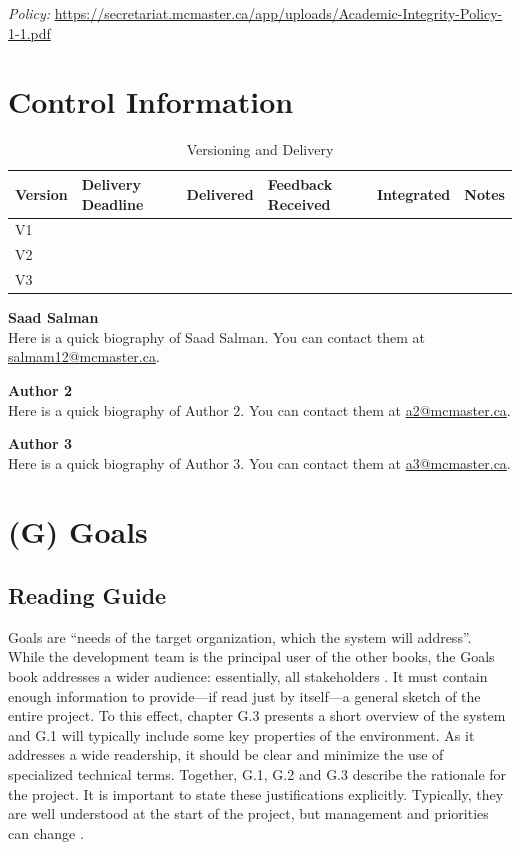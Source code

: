 \documentclass[12pt,letterpaper]{article}
\begin{document}
\medskip
\noindent\textit{Policy:} \url{https://secretariat.mcmaster.ca/app/uploads/Academic-Integrity-Policy-1-1.pdf}

\clearpage

\section{Control Information}
\begin{table}[h!]\centering
\caption*{Versioning and Delivery}
\renewcommand{\arraystretch}{1.2}
\begin{tabularx}{\textwidth}{@{}l l l l l l@{}}
\toprule
\textbf{Version} & \textbf{Delivery Deadline} & \textbf{Delivered} & \textbf{Feedback Received} & \textbf{Integrated} & \textbf{Notes} \\
\midrule
V1 & & & & & \\
V2 & & & & & \\
V3 & & & & & \\
\bottomrule
\end{tabularx}
\end{table}

\medskip
\noindent\textbf{Saad Salman} \\
Here is a quick biography of Saad Salman. You can contact them at \href{mailto:salmam12@mcmaster.ca}{salmam12@mcmaster.ca}.

\medskip
\noindent\textbf{Author 2} \\
Here is a quick biography of Author 2. You can contact them at \href{mailto:a2@mcmaster.ca}{a2@mcmaster.ca}.

\medskip
\noindent\textbf{Author 3} \\
Here is a quick biography of Author 3. You can contact them at \href{mailto:a3@mcmaster.ca}{a3@mcmaster.ca}.

\clearpage

\section{(G) Goals}
\subsection*{Reading Guide}
Goals are ``needs of the target organization, which the system will address''. While the development team is the principal user of the other books, the Goals book addresses a wider audience: essentially, all stakeholders \cite{meyer2022}. It must contain enough information to provide---if read just by itself---a general sketch of the entire project. To this effect, chapter G.3 presents a short overview of the system and G.1 will typically include some key properties of the environment. As it addresses a wide readership, it should be clear and minimize the use of specialized technical terms. Together, G.1, G.2 and G.3 describe the rationale for the project. It is important to state these justifications explicitly. Typically, they are well understood at the start of the project, but management and priorities can change \cite{meyer2022}.
\end{document}
